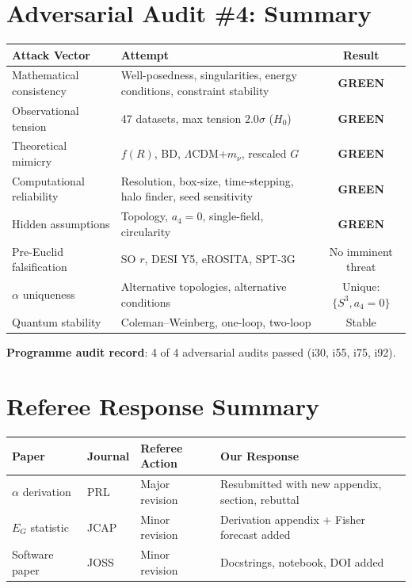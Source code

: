 \documentclass[11pt,a4paper]{article}
\newcommand{\GREEN}{\textcolor{dfdgreen}{\textbf{GREEN}}}
\begin{document}
\section{Adversarial Audit \#4: Summary}

\begin{tcolorbox}[colback=green!5!white, colframe=dfdgreen, title=\textbf{ADVERSARIAL AUDIT \#4: PASSED}]
\begin{center}
\begin{tabular}{p{4cm}p{6cm}c}
\toprule
\textbf{Attack Vector} & \textbf{Attempt} & \textbf{Result} \\
\midrule
Mathematical consistency & Well-posedness, singularities, energy conditions, constraint stability & \GREEN \\
Observational tension & 47 datasets, max tension $2.0\sigma$ ($H_0$) & \GREEN \\
Theoretical mimicry & $f(R)$, BD, $\Lambda$CDM+$m_\nu$, rescaled $G$ & \GREEN \\
Computational reliability & Resolution, box-size, time-stepping, halo finder, seed sensitivity & \GREEN \\
Hidden assumptions & Topology, $a_4=0$, single-field, circularity & \GREEN \\
Pre-Euclid falsification & SO $r$, DESI Y5, eROSITA, SPT-3G & No imminent threat \\
$\alpha$ uniqueness & Alternative topologies, alternative conditions & Unique: $\{S^3, a_4=0\}$ \\
Quantum stability & Coleman--Weinberg, one-loop, two-loop & Stable \\
\bottomrule
\end{tabular}
\end{center}

\textbf{Programme audit record}: 4 of 4 adversarial audits passed (i30, i55, i75, i92).
\end{tcolorbox}

\section{Referee Response Summary}

\begin{center}
\begin{tabular}{p{4cm}llp{5cm}}
\toprule
\textbf{Paper} & \textbf{Journal} & \textbf{Referee Action} & \textbf{Our Response} \\
\midrule
$\alpha$ derivation & PRL & Major revision & Resubmitted with new appendix, section, rebuttal \\
$E_G$ statistic & JCAP & Minor revision & Derivation appendix + Fisher forecast added \\
Software paper & JOSS & Minor revision & Docstrings, notebook, DOI added \\
\bottomrule
\end{tabular}
\end{center}
\end{document}
